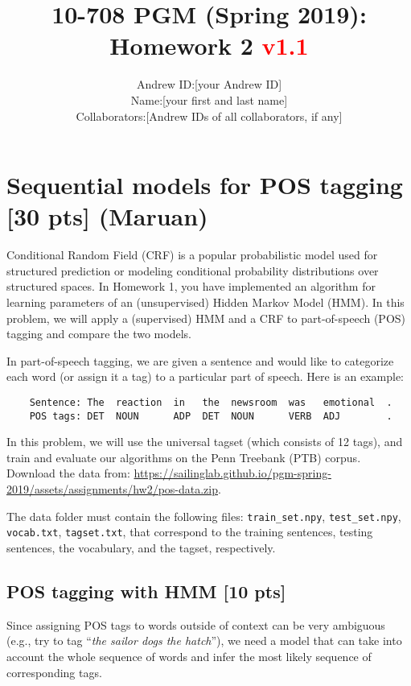 \documentclass[10pt]{article}
\title{10-708 PGM (Spring 2019): Homework 2 \textcolor{red}{v1.1}}
\author{
\begin{tabular}{rl}
Andrew ID: & [your Andrew ID] \\
Name: & [your first and last name] \\
Collaborators: & [Andrew IDs of all collaborators, if any]
\end{tabular}
}
\date{}
\begin{document}
\maketitle

\section{Sequential models for POS tagging [30 pts] (Maruan)}
\label{sec:seq-pos-tagging}

Conditional Random Field (CRF) \cite{lafferty2001crf} is a popular probabilistic model used for structured prediction or modeling conditional probability distributions over structured spaces.
In Homework 1, you have implemented an algorithm for learning parameters of an (unsupervised) Hidden Markov Model (HMM).
In this problem, we will apply a (supervised) HMM and a CRF to part-of-speech (POS) tagging and compare the two models.

In part-of-speech tagging, we are given a sentence and would like to categorize each word (or assign it a tag) to a particular part of speech.
Here is an example:

\begin{verbatim}
    Sentence: The  reaction  in   the  newsroom  was   emotional  .
    POS tags: DET  NOUN      ADP  DET  NOUN      VERB  ADJ        .
\end{verbatim}

In this problem, we will use the universal tagset \cite{petrov2011universal} (which consists of 12 tags), and train and evaluate our algorithms on the Penn Treebank (PTB) corpus.
Download the data from: \url{https://sailinglab.github.io/pgm-spring-2019/assets/assignments/hw2/pos-data.zip}.

The data folder must contain the following files: \texttt{train\_set.npy}, \texttt{test\_set.npy}, \texttt{vocab.txt}, \texttt{tagset.txt}, that correspond to the training sentences, testing sentences, the vocabulary, and the tagset, respectively.

\subsection{POS tagging with HMM [10 pts]}
\label{sec:pos-hmm}

Since assigning POS tags to words outside of context can be very ambiguous (e.g., try to tag ``\emph{the sailor dogs the hatch}''), we need a model that can take into account the whole sequence of words and infer the most likely sequence of corresponding tags.
\end{document}

